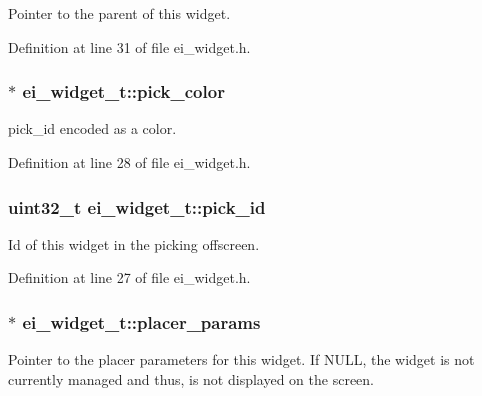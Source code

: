 Pointer to the parent of this widget. 



Definition at line 31 of file ei\-\_\-widget.\-h.

\hypertarget{structei__widget__t_ad1477adf8e6b5cb6a5f11f657fe4781b}{
\subsubsection[{pick\-\_\-color}]{$\ast$ ei\-\_\-widget\-\_\-t\-::pick\-\_\-color}}\label{structei__widget__t_ad1477adf8e6b5cb6a5f11f657fe4781b}


pick\-\_\-id encoded as a color. 



Definition at line 28 of file ei\-\_\-widget.\-h.

\hypertarget{structei__widget__t_ada7ce878377d653d930a57e175b61182}{
\subsubsection[{pick\-\_\-id}]{\setlength{\rightskip}{0pt plus 5cm}uint32\-\_\-t ei\-\_\-widget\-\_\-t\-::pick\-\_\-id}}\label{structei__widget__t_ada7ce878377d653d930a57e175b61182}


Id of this widget in the picking offscreen. 



Definition at line 27 of file ei\-\_\-widget.\-h.

\hypertarget{structei__widget__t_a82c675bf68aa3fa5b14b1f20bd157897}{
\subsubsection[{placer\-\_\-params}]{$\ast$ ei\-\_\-widget\-\_\-t\-::placer\-\_\-params}}\label{structei__widget__t_a82c675bf68aa3fa5b14b1f20bd157897}


Pointer to the placer parameters for this widget. If N\-U\-L\-L, the widget is not currently managed and thus, is not displayed on the screen. 



